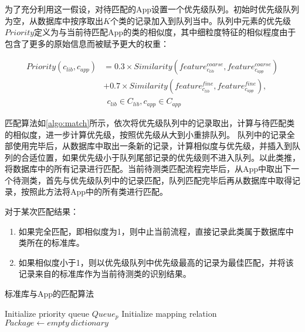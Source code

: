为了充分利用这一假设，对待匹配的App设置一个优先级队列。初始时优先级队列为空，从数据库中按序取出$K$个类的记录加入到队列当中。队列中元素的优先级$Priority$定义为与当前待匹配App的类的相似度，其中细粒度特征的相似程度由于包含了更多的原始信息而被赋予更大的权重：

\begin{equation}
\begin{aligned}
Priority(c_{lib},c_{app})&=0.3\times Similarity(feature^{coarse}_{c_{lib}},feature^{coarse}_{c_{app}})\\
						 &+0.7\times Similarity(feature^{fine}_{c_{lib}},feature^{fine}_{c_{app}}),\\
						 &\ \ c_{lib}\in C_{lib}, c_{app}\in C_{app}
\end{aligned}
\end{equation}


匹配算法如\ref{algo:match}所示，依次将优先级队列中的记录取出，计算与待匹配类的相似度，进一步计算优先级，按照优先级从大到小重排队列。
队列中的记录全部使用完毕后，从数据库中取出一条新的记录，计算相似度与优先级，并插入到队列的合适位置，如果优先级小于队列尾部记录的优先级则不进入队列。以此类推，将数据库中的所有记录进行匹配。当前待测类匹配流程完毕后，从App中取出下一个待测类，首先与优先级队列中的记录匹配，队列匹配完毕后再从数据库中取得记录，按照此方法将App中的所有类进行匹配。

对于某次匹配结果：
\begin{enumerate}
\item{如果完全匹配，即相似度为1，则中止当前流程，直接记录此类属于数据库中类所在的标准库。}
\item{如果相似度小于1，则以优先级队列中优先级最高的记录为最佳匹配，并将该记录来自的标准库作为当前待测类的识别结果。}
\end{enumerate}



\begin{algorithm}[htb]
  \caption{标准库与App的匹配算法}
  \label{algo:match}
  \small
  \SetAlgoLined

  Initialize priority queue $Queue_{p}$\;
  Initialize mapping relation $Package\leftarrow empty\ dictionary$\;
\end{algorithm}




